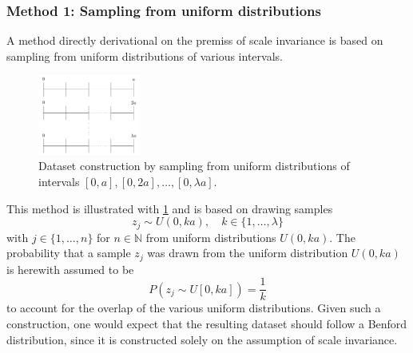 \documentclass[a4paper,10pt, twocolumn]{article}
\begin{document}
\subsubsection{Method 1: Sampling from uniform distributions}
A method directly derivational on the premiss of scale invariance is based on sampling from uniform distributions of various intervals.
\begin{figure}[h]
	\centering
	\includegraphics[width=0.3\textwidth]{figures/uniformscale.pdf}
	\caption{Dataset construction by sampling from uniform distributions of intervals $[0,a], [0,2a], \dots, [0,\lambda a]$.}
	\label{fig:uniformscale}
\end{figure}
This method is illustrated with \cref{fig:uniformscale} and is based on drawing samples 
\begin{equation}
	z_{j} \sim U(0,ka), \quad k \in \{1,\dots,\lambda\}
\end{equation}
with $j \in \{1,\dots,n\}$ for $n \in \mathbb{N}$ from uniform distributions $U(0,ka)$. The probability that a sample $z_j$ was drawn from the uniform distribution $U(0,ka)$ is herewith assumed to be \begin{equation}
	P(z_j \sim U[0,ka]) = \frac{1}{k}
\end{equation} to account for the overlap of the various uniform distributions. Given such a construction, one would expect that the resulting dataset should follow a Benford distribution, since it is constructed solely on the assumption of scale invariance.

\end{document}
